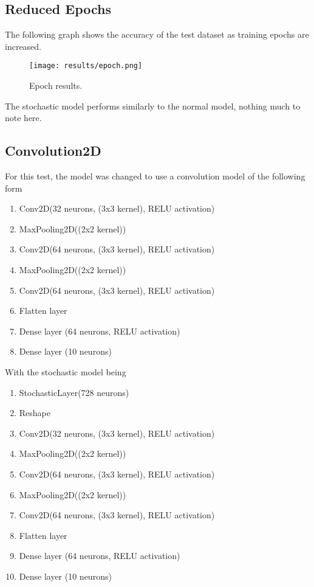 \documentclass[a4paper,oneside,phd,etd]{BYUPhys}
\begin{document}
\vfill
\subsection{Reduced Epochs}
The following graph shows the accuracy of the test dataset as training epochs are increased.
\begin{figure}[H]
\centering
\texttt{[image: results/epoch.png]}
\caption{Epoch results.}
\label{fig:epoch}
\end{figure}
The stochastic model performs similarly to the normal model, nothing much to note here.

\subsection{Convolution2D}
For this test, the model was changed to use a convolution model of the following form
\begin{enumerate}
    \itemsep0em
    \item Conv2D(32 neurons, (3x3 kernel), RELU activation)
    \item MaxPooling2D((2x2 kernel))
    \item Conv2D(64 neurons, (3x3 kernel), RELU activation)
    \item MaxPooling2D((2x2 kernel))
    \item Conv2D(64 neurons, (3x3 kernel), RELU activation)
    \item Flatten layer
    \item Dense layer (64 neurons, RELU activation)
    \item Dense layer (10 neurons)
\end{enumerate}
With the stochastic model being
\begin{enumerate}
    \itemsep0em
    \item StochasticLayer(728 neurons)
    \item Reshape
    \item Conv2D(32 neurons, (3x3 kernel), RELU activation)
    \item MaxPooling2D((2x2 kernel))
    \item Conv2D(64 neurons, (3x3 kernel), RELU activation)
    \item MaxPooling2D((2x2 kernel))
    \item Conv2D(64 neurons, (3x3 kernel), RELU activation)
    \item Flatten layer
    \item Dense layer (64 neurons, RELU activation)
    \item Dense layer (10 neurons)
\end{enumerate}
\end{document}
